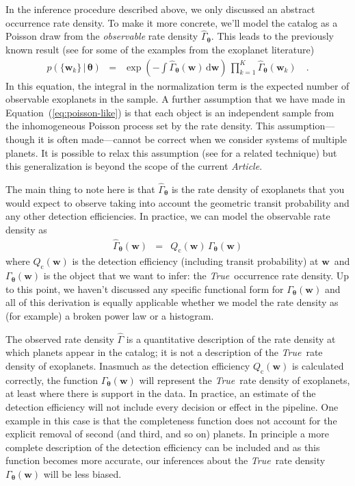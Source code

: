 \documentclass[12pt,preprint]{aastex}
\newcommand{\paper}{\textsl{Article}}
\newcommand{\foreign}[1]{\emph{#1}}
\newcommand{\True}{\foreign{True}}
\newcommand{\Eq}[1]{Equation~(\ref{eq:#1})}
\newcommand{\eq}[1]{\Eq{#1}}
\newcommand{\eqlabel}[1]{\label{eq:#1}}
\newcommand{\dd}{\ensuremath{\,\mathrm{d}}}
\newcommand{\bvec}[1]{\ensuremath{\boldsymbol{#1}}}
\newcommand{\rate}{\ensuremath{\Gamma}}
\newcommand{\ratepar}{{\ensuremath{\theta}}}
\newcommand{\ratepars}{{\ensuremath{\bvec{\ratepar}}}}
\newcommand{\obs}[1]{\ensuremath{\hat{#1}}}
\newcommand{\completeness}{{\ensuremath{Q_\mathrm{c}}}}
\newcommand{\entry}{{\ensuremath{\bvec{w}}}}
\begin{document}
In the inference procedure described above, we only discussed an abstract
occurrence rate density.
To make it more concrete, we'll model the catalog as a Poisson draw from the
\emph{observable} rate density $\obs{\rate}_\ratepars$.
This leads to the previously known result (see \citealt{tabachnik,youdin} for
some of the examples from the exoplanet literature)
\begin{eqnarray}\eqlabel{poisson-like}
p(\{\entry_k\}\,|\,\ratepars) &=&
    \exp\left(-\int \obs{\rate}_\ratepars (\entry) \dd\entry\right) \,
    \prod_{k=1}^K \obs{\rate}_\ratepars (\entry_k)\quad.
\end{eqnarray}
In this equation, the integral in the normalization term is the expected
number of observable exoplanets in the sample.
A further assumption that we have made in \eq{poisson-like} is that each
object is an independent sample from the inhomogeneous Poisson process set by
the rate density.
This assumption---though it is often made---cannot be correct when we consider
systems of multiple planets.
It is possible to relax this assumption (see \citealt{tremaine} for a related
technique) but this generalization is beyond the scope of the current \paper.

The main thing to note here is that $\obs{\rate}_\ratepars$ is the rate
density of exoplanets that you would expect to observe taking into account the
geometric transit probability and any other detection efficiencies.
In practice, we can model the observable rate density as
\begin{eqnarray}\eqlabel{obs-rate}
\obs{\rate}_\ratepars(\entry) &=&
    \completeness(\entry)\,\rate_\ratepars(\entry)
\end{eqnarray}
where $\completeness(\entry)$ is the detection efficiency (including transit
probability) at \entry\ and $\rate_\ratepars(\entry)$ is the object that we
want to infer: the \True\ occurrence rate density.
Up to this point, we haven't discussed any specific functional form for
$\rate_\ratepars(\entry)$ and all of this derivation is equally applicable
whether we model the rate density as (for example) a broken power law or
a histogram.

The observed rate density \obs{\rate} is a quantitative description of the
rate density at which planets appear in the \citet{petigura} catalog; it is
not a description of the \True\ rate density of exoplanets.
Inasmuch as the detection efficiency $\completeness(\entry)$ is calculated
correctly, the function $\rate_\ratepars(\entry)$ will represent the \True\
rate density of exoplanets, at least where there is support in the data.
In practice, an estimate of the detection efficiency will not include every
decision or effect in the pipeline.
One example in this case is that the completeness function does not account
for the explicit removal of second (and third, and so on) planets.
In principle a more complete description of the detection efficiency can be
included and as this function becomes more accurate, our inferences about the
\True\ rate density $\rate_\ratepars(\entry)$ will be less biased.
\end{document}
